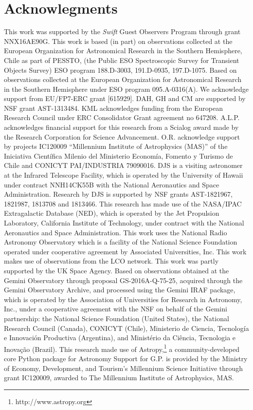 \documentclass[a4paper,fleqn,usenatbib]{mnras}
\begin{document}
\section*{Acknowlegments}
This work was supported by the {\it Swift} Guest Observers Program through grant NNX16AE90G.
This work is based (in part) on observations collected at the European Organization for Astronomical Research in the Southern Hemisphere, Chile as part of PESSTO, (the Public ESO Spectroscopic Survey for Transient Objects Survey) ESO program 188.D-3003, 191.D-0935, 197.D-1075.
Based on observations collected at the European Organization for Astronomical Research in the Southern Hemisphere under ESO program 095.A-0316(A). 
We acknowledge support from EU/FP7-ERC grant [615929].
DAH, GH and CM are supported by NSF grant AST-1313484.
KML acknowledges funding from the European Research Council under ERC Consolidator Grant agreement no 647208.
A.L.P. acknowledges financial support for this research from a Scialog award made by the Research Corporation for Science Advancement.
O.R. acknowledge support by projects IC120009 ``Millennium Institute of Astrophysics (MAS)'' of the Iniciativa Cient\'ifica Milenio del Ministerio Econom\'ia, Fomento y Turismo de Chile and CONICYT PAI/INDUSTRIA 79090016. 
DJS is a visiting astronomer at the Infrared Telescope Facility, which is operated by the University of Hawaii under contract NNH14CK55B with the National Aeronautics and Space Administration.
Research by DJS is supported by NSF grants AST-1821967, 1821987, 1813708 and 1813466.
This research has made use of the NASA/IPAC Extragalactic Database (NED), which is operated by the Jet Propulsion Laboratory, California Institute of Technology, under contract with the National Aeronautics and Space Administration.
This work uses the National Radio Astronomy Observatory which is a facility of the National Science Foundation operated under cooperative agreement by Associated Universities, Inc.
This work makes use of observations from the LCO network. 
This work was partly supported by the UK Space Agency.
Based on observations obtained at the Gemini Observatory through proposal GS-2016A-Q-75-25, acquired through the Gemini Observatory Archive, and processed using the Gemini IRAF package, which is operated by the Association of Universities for Research in Astronomy, Inc., under a cooperative agreement with the NSF on behalf of the Gemini partnership: the National Science Foundation (United States), the National Research Council (Canada), CONICYT (Chile), Ministerio de Ciencia, Tecnolog\'{i}a e Innovaci\'{o}n Productiva (Argentina), and Minist\'{e}rio da Ci\^{e}ncia, Tecnologia e Inova\c{c}\~{a}o (Brazil).
This research made use of Astropy,\footnote{http://www.astropy.org} a community-developed core Python package for Astronomy \citep{astropy:2013, astropy:2018}
Support for G.P. is provided by the Ministry of Economy, Development, and Tourism's Millennium Science Initiative through grant IC120009, awarded to The Millennium Institute of Astrophysics, MAS.\\
\end{document}
